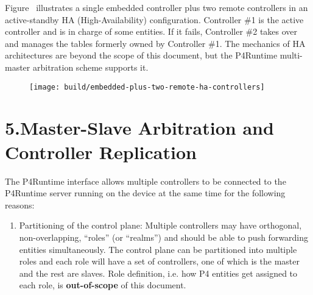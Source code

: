 \documentclass[11pt]{article}
\begin{document}
{%
\noindent{}Figure~ illustrates a single
embedded controller plus two remote controllers in an active-standby HA
(High-Availability) configuration. Controller \#1 is the active controller and is
in charge of some entities. If it fails, Controller \#2 takes over and manages
the tables formerly owned by Controller \#1. The mechanics of HA architectures
are beyond the scope of this document, but the P4Runtime multi-master
arbitration scheme supports it.%

\begin{figure}[tbp]%
\begin{mdcenter}%

\noindent{}\texttt{[image: build/embedded-plus-two-remote-ha-controllers]}{}%

\mdhr{}%

\noindent{}%
\end{mdcenter}\label{fig-embedded-plus-two-remote-ha-controllers}%
\end{figure}%

\section{5.\hspace*{0.5em}Master-Slave Arbitration and Controller Replication}\label{sec-master-slave-arbitration-and-controller-replication}%

\noindent{}The P4Runtime interface allows multiple controllers to be connected to the
P4Runtime server running on the device at the same time for the following
reasons:%

\begin{enumerate}%

\item{}
Partitioning of the control plane: Multiple controllers may have orthogonal,
non-overlapping, \textquotedblleft{}roles\textquotedblright{} (or \textquotedblleft{}realms\textquotedblright{}) and should be able to push forwarding
entities simultaneously. The control plane can be partitioned into multiple
roles and each role will have a set of controllers, one of which is the
master and the rest are slaves. Role definition, i.e. how P4 entities get
assigned to each role, is \textbf{out-of-scope} of this document.%


\end{enumerate}}
\end{document}
